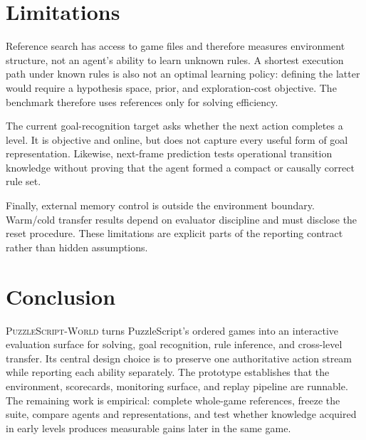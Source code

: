 \documentclass[sigconf,nonacm]{acmart}
\newcommand{\benchmarkname}{\textsc{PuzzleScript-World}}
\begin{document}
\section{Limitations}

Reference search has access to game files and therefore measures environment
structure, not an agent's ability to learn unknown rules. A shortest execution
path under known rules is also not an optimal learning policy: defining the
latter would require a hypothesis space, prior, and exploration-cost objective.
The benchmark therefore uses references only for solving efficiency.

The current goal-recognition target asks whether the next action completes a
level. It is objective and online, but does not capture every useful form of
goal representation. Likewise, next-frame prediction tests operational
transition knowledge without proving that the agent formed a compact or
causally correct rule set.

Finally, external memory control is outside the environment boundary. Warm/cold
transfer results depend on evaluator discipline and must disclose the reset
procedure. These limitations are explicit parts of the reporting contract
rather than hidden assumptions.

\section{Conclusion}

\benchmarkname{} turns PuzzleScript's ordered games into an interactive
evaluation surface for solving, goal recognition, rule inference, and
cross-level transfer. Its central design choice is to preserve one
authoritative action stream while reporting each ability separately. The
prototype establishes that the environment, scorecards, monitoring surface,
and replay pipeline are runnable. The remaining work is empirical: complete
whole-game references, freeze the suite, compare agents and representations,
and test whether knowledge acquired in early levels produces measurable gains
later in the same game.



\end{document}
